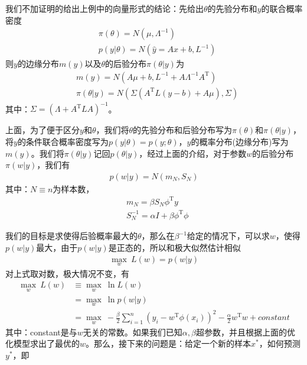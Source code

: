         \par
        我们不加证明的给出上例中的向量形式的结论：先给出$\theta$的先验分布和$y$的联合概率密度
        \begin{align*}
        &\pi(\theta) = N(\mu,\varLambda^{-1}) \\
        &p(y|\theta) = N(\hat{y} = Ax+b,L^{-1})
        \end{align*}
        则$y$的边缘分布$m(y)$以及$\theta$的后验分布$\pi(\theta|y)$为
        \begin{align*}
        &m(y) = N(A\mu+b,L^{-1}+A\varLambda^{-1}A^{\mathrm{T}})\\
        &\pi(\theta|y) = N(\Sigma(A^\mathrm{T}L(y-b)+A\mu),\Sigma)
        \end{align*}
        其中：$\Sigma = (\varLambda +A^\mathrm{T} L A)^{-1}$。
        \par
        上面，为了便于区分$y$和$\theta$，我们将$\theta$的先验分布和后验分布写为$\pi(\theta)$和$\pi(\theta|y)$，将$y$的条件联合概率密度写为$p(y|\theta) = p(y;\theta)$，$y$的概率分布(边缘分布)写为$m(y)$。我们将$\pi(\theta|y)$记回$p(\theta|y)$，经过上面的介绍，对于参数$w$的后验分布$\pi(w|y)$，我们有
        \begin{align*}
        p(w|y)  = N(m_N,S_N)
        \end{align*}
        其中：$N \equiv n$为样本数，
        \begin{align*}
        &m_N = \beta S_N\phi ^\mathrm{T}y\\
        &S_N^{-1} = \alpha I+ \beta \phi^\mathrm{T}\phi
        \end{align*}
        \par
        我们的目标是求使得后验概率最大的$\theta$，那么在$\beta^{-1}$给定的情况下，可以求$w$，使得$p(w|y)$最大，由于$p(w|y)$是正态的，所以和极大似然估计相似
        \begin{align*}
        \max_w \ L(w) = p(w|y)
        \end{align*}
        对上式取对数，极大情况不变，有
        \begin{align*}
        \max_w \ L(w) &\equiv \max_w \ \ln L(w) \\
        &=\max_w \ \ln p(w|y) \\
        &=\max_w \ -\frac{\beta}{2}\sum_{i=1}^n \left( y_i - w^\mathrm{T}\phi(x_i) \right) ^2 - \frac{\alpha}{2}w^\mathrm{T}w + constant
        \end{align*}
        其中：constant是与$w$无关的常数。如果我们已知$\alpha,\beta$超参数，并且根据上面的优化模型求出了最优的$w$。那么，接下来的问题是：给定一个新的样本$x^*$，如何预测$y^*$，即
